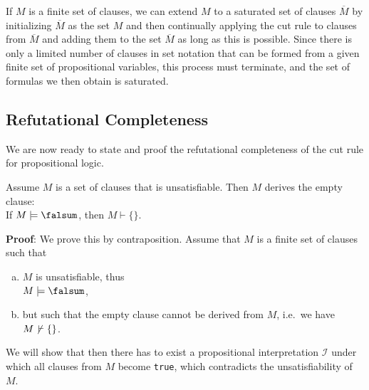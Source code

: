 \remarkEng
If $M$ is a finite set of clauses, we can extend $M$ to a saturated set of clauses
$\overline{M}$ by initializing $\overline{M}$ as the set $M$ and then continually applying the
cut rule to clauses from $\overline{M}$ and adding them to the set $\overline{M}$ as long as this is possible.
Since there is only a limited number of clauses in set notation that can be formed from a given finite set of
propositional variables, this process must terminate, and the set of formulas we then obtain is saturated. \eox 

\subsection{Refutational Completeness}
We are now ready to state and proof the refutational completeness of the cut rule for propositional logic.

\begin{Theorem}[\textcolor{blue}{Refutational Completeness}] \label{widerlegungs-vollstaendig} \hspace*{\fill} \linebreak
  Assume $M$ is a set of clauses that is unsatisfiable.  Then $M$ derives the empty clause:
  \\[0.2cm]
  \hspace*{1.3cm} 
  If $M \models \falsum$, then $M \vdash \{\}$.
\end{Theorem}

\noindent
\textbf{Proof}: We prove this by contraposition. Assume that $M$ is a finite set of clauses such that
\begin{enumerate}[(a)]
\item $M$ is unsatisfiable, thus
      \\[0.2cm]
      \hspace*{1.3cm}
      $M \models \falsum$,
\item but such that the empty clause cannot be derived from $M$, i.e.~we have
      \\[0.2cm]
      \hspace*{1.3cm}
      $M \not\,\vdash \{\}$.
\end{enumerate}
We will show that then there has to exist a propositional interpretation $\mathcal{I}$ under which all clauses
from $M$ become \texttt{true}, which contradicts the unsatisfiability of $M$. 


